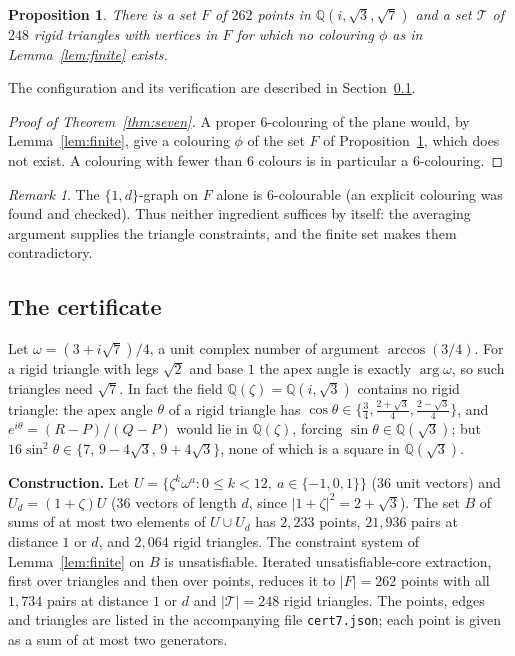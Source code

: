 \documentclass[11pt,a4paper]{amsart}
\newtheorem{proposition}[theorem]{Proposition}
\theoremstyle{remark}
\newtheorem{remark}[theorem]{Remark}
\newcommand{\Q}{\mathbb{Q}}
\begin{document}
\begin{proposition}\label{prop:cert}
There is a set $F$ of $262$ points in $\Q(i,\sqrt3,\sqrt7)$ and a set $\mathcal T$ of $248$ rigid triangles with vertices in $F$ for which no colouring $\phi$ as in Lemma~\ref{lem:finite} exists.
\end{proposition}

The configuration and its verification are described in Section~\ref{sec:cert}.

\begin{proof}[Proof of Theorem~\ref{thm:seven}]
A proper $6$-colouring of the plane would, by Lemma~\ref{lem:finite}, give a colouring $\phi$ of the set $F$ of Proposition~\ref{prop:cert}, which does not exist. A colouring with fewer than $6$ colours is in particular a $6$-colouring.
\end{proof}

\begin{remark}
The $\{1,d\}$-graph on $F$ alone is $6$-colourable (an explicit colouring was found and checked). Thus neither ingredient suffices by itself: the averaging argument supplies the triangle constraints, and the finite set makes them contradictory.
\end{remark}

\subsection{The certificate}\label{sec:cert}

Let $\omega=(3+i\sqrt7)/4$, a unit complex number of argument $\arccos(3/4)$. For a rigid triangle with legs $\sqrt2$ and base $1$ the apex angle is exactly $\arg\omega$, so such triangles need $\sqrt7$. In fact the field $\Q(\zeta)=\Q(i,\sqrt3)$ contains no rigid triangle: the apex angle $\theta$ of a rigid triangle has $\cos\theta\in\{\tfrac34,\tfrac{2+\sqrt3}4,\tfrac{2-\sqrt3}4\}$, and $e^{i\theta}=(R-P)/(Q-P)$ would lie in $\Q(\zeta)$, forcing $\sin\theta\in\Q(\sqrt3)$; but $16\sin^2\theta\in\{7,\,9-4\sqrt3,\,9+4\sqrt3\}$, none of which is a square in $\Q(\sqrt3)$.

\medskip\noindent\textbf{Construction.} Let $U=\{\zeta^k\omega^a:0\le k<12,\ a\in\{-1,0,1\}\}$ ($36$ unit vectors) and $U_d=(1+\zeta)U$ ($36$ vectors of length $d$, since $|1+\zeta|^2=2+\sqrt3$). The set $B$ of sums of at most two elements of $U\cup U_d$ has $2{,}233$ points, $21{,}936$ pairs at distance $1$ or $d$, and $2{,}064$ rigid triangles. The constraint system of Lemma~\ref{lem:finite} on $B$ is unsatisfiable. Iterated unsatisfiable-core extraction, first over triangles and then over points, reduces it to $|F|=262$ points with all $1{,}734$ pairs at distance $1$ or $d$ and $|\mathcal T|=248$ rigid triangles. The points, edges and triangles are listed in the accompanying file \texttt{cert7.json}; each point is given as a sum of at most two generators.
\end{document}
